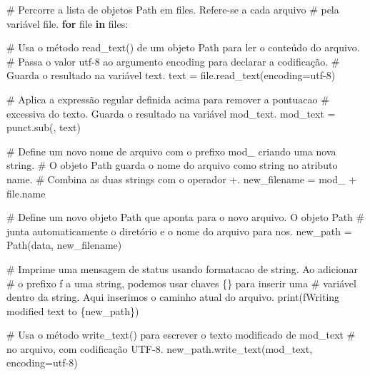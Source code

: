 \documentclass[
  brazilian,
  11pt,
]{article}
\newenvironment{Shaded}{\begin{snugshade}}{\end{snugshade}}
\newcommand{\BuiltInTok}[1]{\textcolor[rgb]{0.50,0.55,0.55}{#1}}
\newcommand{\CommentTok}[1]{\textcolor[rgb]{0.48,0.49,0.49}{#1}}
\newcommand{\ControlFlowTok}[1]{\textcolor[rgb]{0.99,0.74,0.29}{\textbf{#1}}}
\newcommand{\KeywordTok}[1]{\textcolor[rgb]{0.81,0.81,0.76}{\textbf{#1}}}
\newcommand{\NormalTok}[1]{\textcolor[rgb]{0.81,0.81,0.76}{#1}}
\newcommand{\OperatorTok}[1]{\textcolor[rgb]{0.81,0.81,0.76}{#1}}
\newcommand{\SpecialCharTok}[1]{\textcolor[rgb]{0.24,0.68,0.91}{#1}}
\newcommand{\SpecialStringTok}[1]{\textcolor[rgb]{0.85,0.27,0.33}{#1}}
\newcommand{\StringTok}[1]{\textcolor[rgb]{0.96,0.31,0.31}{#1}}
\begin{document}
\begin{Shaded}
\begin{Highlighting}[]
\CommentTok{\# Percorre a lista de objetos Path em \textquotesingle{}files\textquotesingle{}. Refere{-}se a cada arquivo}
\CommentTok{\# pela variável \textquotesingle{}file\textquotesingle{}.}
\ControlFlowTok{for} \BuiltInTok{file} \KeywordTok{in}\NormalTok{ files:}

    \CommentTok{\# Usa o método read\_text() de um objeto Path para ler o conteúdo do arquivo.}
    \CommentTok{\# Passa o valor \textquotesingle{}utf{-}8\textquotesingle{} ao argumento \textquotesingle{}encoding\textquotesingle{} para declarar a codificação.}
    \CommentTok{\# Guarda o resultado na variável \textquotesingle{}text\textquotesingle{}.}
\NormalTok{    text }\OperatorTok{=} \BuiltInTok{file}\NormalTok{.read\_text(encoding}\OperatorTok{=}\StringTok{\textquotesingle{}utf{-}8\textquotesingle{}}\NormalTok{)}

    \CommentTok{\# Aplica a expressão regular definida acima para remover a pontuacao}
    \CommentTok{\# excessiva do texto. Guarda o resultado na variável \textquotesingle{}mod\_text\textquotesingle{}.}
\NormalTok{    mod\_text }\OperatorTok{=}\NormalTok{ punct.sub(}\StringTok{\textquotesingle{}\textquotesingle{}}\NormalTok{, text)}

    \CommentTok{\# Define um novo nome de arquivo com o prefixo \textquotesingle{}mod\_\textquotesingle{} criando uma nova string.}
    \CommentTok{\# O objeto Path guarda o nome do arquivo como string no atributo \textquotesingle{}name\textquotesingle{}.}
    \CommentTok{\# Combina as duas strings com o operador \textquotesingle{}+\textquotesingle{}.}
\NormalTok{    new\_filename }\OperatorTok{=} \StringTok{\textquotesingle{}mod\_\textquotesingle{}} \OperatorTok{+} \BuiltInTok{file}\NormalTok{.name}

    \CommentTok{\# Define um novo objeto Path que aponta para o novo arquivo. O objeto Path}
    \CommentTok{\# junta automaticamente o diretório e o nome do arquivo para nos.}
\NormalTok{    new\_path }\OperatorTok{=}\NormalTok{ Path(}\StringTok{\textquotesingle{}data\textquotesingle{}}\NormalTok{, new\_filename)}

    \CommentTok{\# Imprime uma mensagem de status usando formatacao de string. Ao adicionar}
    \CommentTok{\# o prefixo \textquotesingle{}f\textquotesingle{} a uma string, podemos usar chaves \{\} para inserir uma}
    \CommentTok{\# variável dentro da string. Aqui inserimos o caminho atual do arquivo.}
    \BuiltInTok{print}\NormalTok{(}\SpecialStringTok{f\textquotesingle{}Writing modified text to }\SpecialCharTok{\{}\NormalTok{new\_path}\SpecialCharTok{\}}\SpecialStringTok{\textquotesingle{}}\NormalTok{)}

    \CommentTok{\# Usa o método write\_text() para escrever o texto modificado de \textquotesingle{}mod\_text\textquotesingle{}}
    \CommentTok{\# no arquivo, com codificação UTF{-}8.}
\NormalTok{    new\_path.write\_text(mod\_text, encoding}\OperatorTok{=}\StringTok{\textquotesingle{}utf{-}8\textquotesingle{}}\NormalTok{)}
\end{Highlighting}
\end{Shaded}
\end{document}
